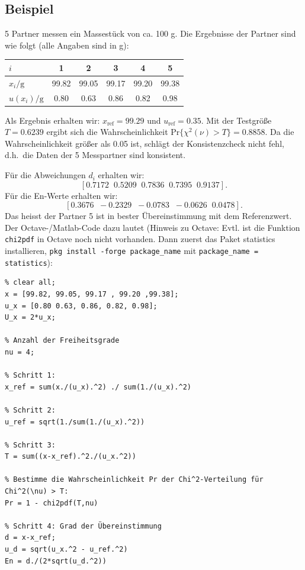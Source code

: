\subsection{Beispiel}
\label{Beispielringvergleich1}
5 Partner messen ein Massestück von ca. 100 g. Die Ergebnisse 
der Partner sind wie folgt (alle Angaben sind in g):
\begin{center}
\begin{tabular}{l | c c c c c}
$i$	& 1 & 2 & 3 & 4 & 5 \\	\hline
$x_i / \mathrm{g}$ & 99.82 &  99.05 & 99.17 & 99.20 & 99.38  \\ \hline
$u(x_i) / \mathrm{g}$ & 0.80 & 0.63 & 0.86 & 0.82 & 0.98  
\end{tabular}
\end{center}
Als Ergebnis erhalten wir: $x_\mathrm{ref} = 99.29$ und $u_\mathrm{ref} = 0.35$. 
Mit der Testgröße $T=0.6239$ ergibt sich die Wahrscheinlichkeit 
$\mathrm{Pr}\{\chi^2(\nu) > T\} = 0.8858$. Da die Wahrscheinlichkeit größer als 0.05 ist, schlägt der
Konsistenzcheck nicht fehl, 
d.h.\ die Daten der 5 Messpartner sind konsistent.

Für die Abweichungen $d_i$ erhalten wir: 
$$
[0.7172 \;\;   0.5209 \;\;   0.7836  \;\;  0.7395 \;\;   0.9137]. 
$$
Für die En-Werte erhalten wir: 
$$
[ 0.3676 \;\;  -0.2329 \;\;  -0.0783 \;\;  -0.0626 \;\;   0.0478].
$$
Das heisst der Partner 5 ist in bester Übereinstimmung mit dem Referenzwert. \\
Der Octave-/Matlab-Code dazu lautet (Hinweis zu Octave: Evtl. ist die Funktion
\texttt{chi2pdf} in Octave noch nicht vorhanden. Dann zuerst das Paket statistics
installieren, \texttt{pkg install -forge package\_name} mit 
\texttt{package\_name = statistics}): 
\begin{verbatim}
% clear all;
x = [99.82, 99.05, 99.17 , 99.20 ,99.38];
u_x = [0.80 0.63, 0.86, 0.82, 0.98];
U_x = 2*u_x;

% Anzahl der Freiheitsgrade
nu = 4;

% Schritt 1:
x_ref = sum(x./(u_x).^2) ./ sum(1./(u_x).^2)

% Schritt 2: 
u_ref = sqrt(1./sum(1./(u_x).^2))

% Schritt 3: 
T = sum((x-x_ref).^2./(u_x.^2))

% Bestimme die Wahrscheinlichkeit Pr der Chi^2-Verteilung für Chi^2(\nu) > T:
Pr = 1 - chi2pdf(T,nu)

% Schritt 4: Grad der Übereinstimmung
d = x-x_ref;
u_d = sqrt(u_x.^2 - u_ref.^2)
En = d./(2*sqrt(u_d.^2))
\end{verbatim}

